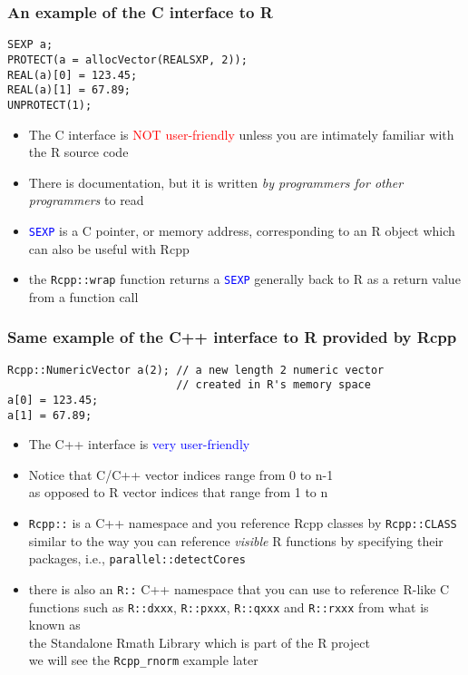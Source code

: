 \documentclass[11pt,pdftex,dvipsnames,usenames,helvetica]{beamer}
\begin{document}
\begin{frame}[fragile]
\frametitle{An example of the C interface to R}
\begin{verbatim}
SEXP a;
PROTECT(a = allocVector(REALSXP, 2));
REAL(a)[0] = 123.45;
REAL(a)[1] = 67.89;
UNPROTECT(1);
\end{verbatim}
\begin{itemize}
\item The C interface is \textcolor{red}{NOT user-friendly} unless you
  are intimately familiar with the R source code
\item There is documentation, but it is written {\it by programmers for
other programmers} to read
\item \textcolor{blue}{\tt SEXP} is a C pointer, or memory address, corresponding to an R object which can also be useful with Rcpp
\item 
the {\tt Rcpp::wrap} function returns a \textcolor{blue}{\tt SEXP}
generally back to R as a return value from a function call
\end{itemize}
\end{frame}

\begin{frame}[fragile]
\frametitle{Same example of the C++ interface to R provided by Rcpp}
\begin{verbatim}
Rcpp::NumericVector a(2); // a new length 2 numeric vector 
                          // created in R's memory space
a[0] = 123.45;
a[1] = 67.89;
\end{verbatim}
\begin{itemize}
\item The C++ interface is \textcolor{blue}{very user-friendly}
\item Notice that C/C++ vector indices range from 0 to n-1\\
as opposed to R vector indices that range from 1 to n
\item {\tt Rcpp::} is a C++ namespace and you reference 
Rcpp classes by {\tt Rcpp::CLASS}\\
similar to the way you can reference {\it visible} 
R functions by specifying their packages, i.e., {\tt parallel::detectCores}
\item there is also an {\tt R::} C++ namespace that you can
use to reference R-like C functions such as {\tt R::dxxx}, {\tt R::pxxx},
{\tt R::qxxx} and {\tt R::rxxx} from what is known as\\ 
the Standalone Rmath Library which is part of the R project\\
we will see the {\tt Rcpp\_rnorm} example later
\end{itemize}
\end{frame}
\end{document}
